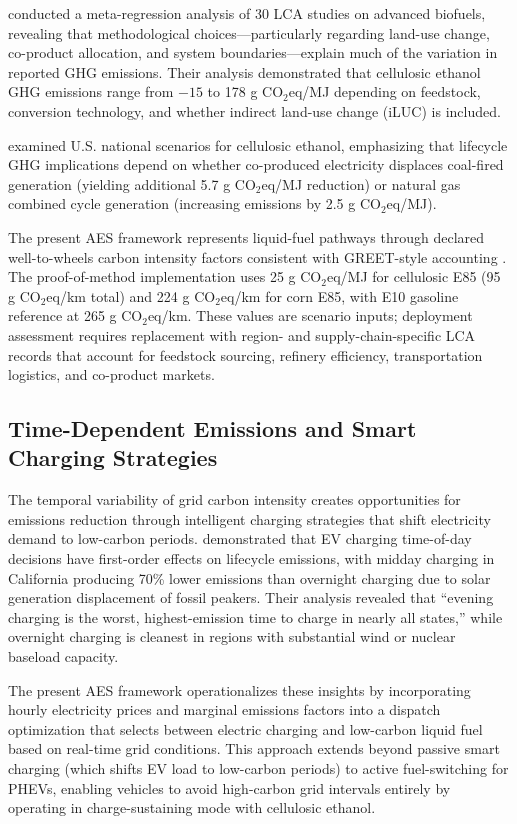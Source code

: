 \documentclass[cleantechnol,article,submit,pdftex,moreauthors]{Definitions/mdpi}
\begin{document}
\citet{Menten2013} conducted a meta-regression analysis of 30 LCA studies on advanced biofuels, revealing that methodological choices—particularly regarding land-use change, co-product allocation, and system boundaries—explain much of the variation in reported GHG emissions. Their analysis demonstrated that cellulosic ethanol GHG emissions range from $-15$ to 178 g CO$_2$eq/MJ depending on feedstock, conversion technology, and whether indirect land-use change (iLUC) is included.

\citet{Scown2012} examined U.S. national scenarios for cellulosic ethanol, emphasizing that lifecycle GHG implications depend on whether co-produced electricity displaces coal-fired generation (yielding additional 5.7 g CO$_2$eq/MJ reduction) or natural gas combined cycle generation (increasing emissions by 2.5 g CO$_2$eq/MJ).

The present AES framework represents liquid-fuel pathways through declared well-to-wheels carbon intensity factors consistent with GREET-style accounting \citep{Elgowainy2018}. The proof-of-method implementation uses 25 g CO$_2$eq/MJ for cellulosic E85 (95 g CO$_2$eq/km total) and 224 g CO$_2$eq/km for corn E85, with E10 gasoline reference at 265 g CO$_2$eq/km. These values are scenario inputs; deployment assessment requires replacement with region- and supply-chain-specific LCA records that account for feedstock sourcing, refinery efficiency, transportation logistics, and co-product markets.

\subsection{Time-Dependent Emissions and Smart Charging Strategies}

The temporal variability of grid carbon intensity creates opportunities for emissions reduction through intelligent charging strategies that shift electricity demand to low-carbon periods. \citet{Miller2021} demonstrated that EV charging time-of-day decisions have first-order effects on lifecycle emissions, with midday charging in California producing 70\% lower emissions than overnight charging due to solar generation displacement of fossil peakers. Their analysis revealed that ``evening charging is the worst, highest-emission time to charge in nearly all states,'' while overnight charging is cleanest in regions with substantial wind or nuclear baseload capacity.

The present AES framework operationalizes these insights by incorporating hourly electricity prices and marginal emissions factors into a dispatch optimization that selects between electric charging and low-carbon liquid fuel based on real-time grid conditions. This approach extends beyond passive smart charging (which shifts EV load to low-carbon periods) to active fuel-switching for PHEVs, enabling vehicles to avoid high-carbon grid intervals entirely by operating in charge-sustaining mode with cellulosic ethanol.
\end{document}
